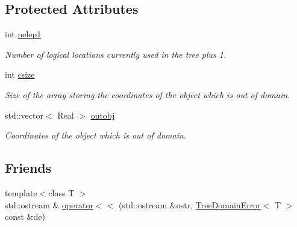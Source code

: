 \subsection*{Protected Attributes}
\begin{DoxyCompactItemize}
\item 
\hypertarget{classTreeDomainError_ab6f1f38f2cff2ee9c561e49ec678069d}{
int \hyperlink{classTreeDomainError_ab6f1f38f2cff2ee9c561e49ec678069d}{nelep1}}
\label{classTreeDomainError_ab6f1f38f2cff2ee9c561e49ec678069d}

\begin{DoxyCompactList}\small\item\em Number of logical locations currently used in the tree plus 1. \item\end{DoxyCompactList}\item 
\hypertarget{classTreeDomainError_a4549e1a6439fcfc9a581505e21f3fcec}{
int \hyperlink{classTreeDomainError_a4549e1a6439fcfc9a581505e21f3fcec}{csize}}
\label{classTreeDomainError_a4549e1a6439fcfc9a581505e21f3fcec}

\begin{DoxyCompactList}\small\item\em Size of the array storing the coordinates of the object which is out of domain. \item\end{DoxyCompactList}\item 
\hypertarget{classTreeDomainError_a181c509a5e1dbcf4c3b2f0c1918a8345}{
std::vector$<$ Real $>$ \hyperlink{classTreeDomainError_a181c509a5e1dbcf4c3b2f0c1918a8345}{outobj}}
\label{classTreeDomainError_a181c509a5e1dbcf4c3b2f0c1918a8345}

\begin{DoxyCompactList}\small\item\em Coordinates of the object which is out of domain. \item\end{DoxyCompactList}\end{DoxyCompactItemize}
\subsection*{Friends}
\begin{DoxyCompactItemize}
\item 
{\footnotesize template$<$class T $>$ }\\std::ostream \& \hyperlink{classTreeDomainError_a25d8eeca1719586bbbaeac6a01aa178b}{operator$<$$<$} (std::ostream \&ostr, \hyperlink{classTreeDomainError}{TreeDomainError}$<$ T $>$ const \&de)
\end{DoxyCompactItemize}


